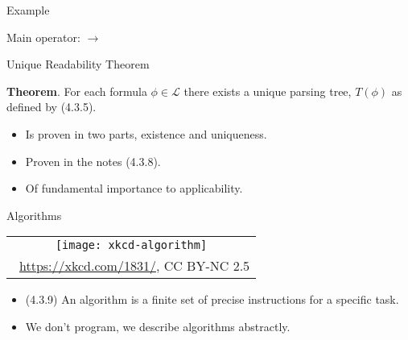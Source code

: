 \documentclass[../slides.tex]{subfiles}
\begin{document}
\begin{frame}{Example}

\begin{center}

Main operator: $\to$
\end{center}

\end{frame}

\begin{frame}{Unique Readability Theorem}

	\textbf{Theorem}. For each formula $\phi\in\mathcal{L}$ there exists a unique parsing tree, $T(\phi)$ as defined by (4.3.5).

	\begin{itemize}
	
		\item Is proven in two parts, existence and uniqueness.
		
		\item Proven in the notes (4.3.8).
		
		\item Of fundamental importance to applicability.
	
	\end{itemize}


\end{frame}

\begin{frame}{Algorithms}

\begin{center}
		\begin{tabular}{c}
		\texttt{[image: xkcd-algorithm]}\\[-1ex]
		{\tiny \textcopyright~\url{https://xkcd.com/1831/}, CC BY-NC 2.5}
		\end{tabular}
		\end{center}

	\begin{itemize}
	
		\item (4.3.9) An algorithm is a finite set of precise instructions for a specific task. 
	
		\item We don't program, we describe algorithms abstractly.
	
	\end{itemize}

\end{frame}
\end{document}
